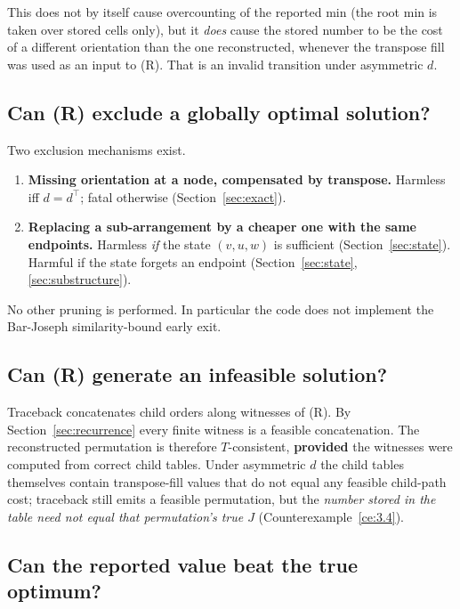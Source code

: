 \documentclass[11pt]{article}
\theoremstyle{plain}
\begin{document}
This does not by itself cause overcounting of the reported min (the root min is
taken over stored cells only), but it \emph{does} cause the stored number to be
the cost of a different orientation than the one reconstructed, whenever the
transpose fill was used as an input to (R). That is an invalid transition under
asymmetric \(d\).

\subsection{Can (R) exclude a globally optimal solution?}

Two exclusion mechanisms exist.

\begin{enumerate}[label=\arabic*.]
\item \textbf{Missing orientation at a node, compensated by transpose.}
  Harmless iff \(d = d^\top\); fatal otherwise (Section~\ref{sec:exact}).
\item \textbf{Replacing a sub-arrangement by a cheaper one with the same
  endpoints.} Harmless \emph{if} the state \((v,u,w)\) is sufficient
  (Section~\ref{sec:state}). Harmful if the state forgets an endpoint
  (Section~\ref{sec:state}, \ref{sec:substructure}).
\end{enumerate}

No other pruning is performed. In particular the code does not implement the
Bar-Joseph similarity-bound early exit.

\subsection{Can (R) generate an infeasible solution?}

Traceback concatenates child orders along witnesses of (R). By
Section~\ref{sec:recurrence} every finite witness is a feasible concatenation.
The reconstructed permutation is therefore \(T\)-consistent,
\textbf{provided} the witnesses were computed from correct child tables. Under
asymmetric \(d\) the child tables themselves contain transpose-fill values that
do not equal any feasible child-path cost; traceback still emits a feasible
permutation, but the \emph{number stored in the table need not equal that
permutation's true \(J\)} (Counterexample~\ref{ce:3.4}).

\subsection{Can the reported value beat the true optimum?}
\end{document}
